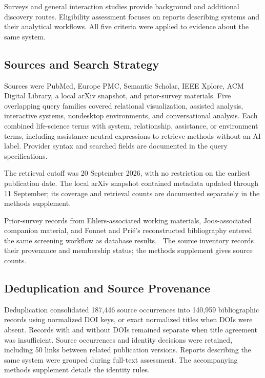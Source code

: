 Surveys and general interaction studies provide background and additional discovery routes. Eligibility assessment focuses on reports describing systems and their analytical workflows. All five criteria were applied to evidence about the same system.

\subsection{Sources and Search Strategy}
\label{sec:methodology-search}
Sources were PubMed, Europe PMC, Semantic Scholar, IEEE Xplore, ACM Digital Library, a local arXiv snapshot, and prior-survey materials. Five overlapping query families covered relational visualization, assisted analysis, interactive systems, nondesktop environments, and conversational analysis. Each combined life-science terms with system, relationship, assistance, or environment terms, including assistance-neutral expressions to retrieve methods without an AI label. Provider syntax and searched fields are documented in the query specifications.

The retrieval cutoff was 20 September 2026, with no restriction on the earliest publication date. The local arXiv snapshot contained metadata updated through 11 September; its coverage and retrieval counts are documented separately in the methods supplement.

Prior-survey records from Ehlers-associated working materials, Joos-associated companion material, and Fonnet and Pri\'e's reconstructed bibliography entered the same screening workflow as database results.~\cite{Ehlers2025,Joos2025VisNetIA,Fonnet2019ImmersiveAnalytics} The source inventory records their provenance and membership status; the methods supplement gives source counts.

\subsection{Deduplication and Source Provenance}
\label{sec:methodology-deduplication}
Deduplication consolidated 187,446 source occurrences into 140,959 bibliographic records using normalized DOI keys, or exact normalized titles when DOIs were absent. Records with and without DOIs remained separate when title agreement was insufficient. Source occurrences and identity decisions were retained, including 50 links between related publication versions. Reports describing the same system were grouped during full-text assessment. The accompanying methods supplement details the identity rules.

